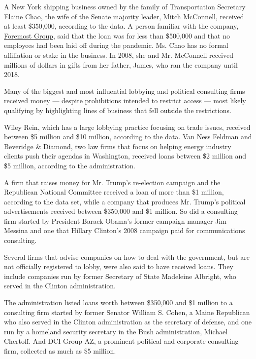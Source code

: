 A New York shipping business owned by the family of Transportation
Secretary Elaine Chao, the wife of the Senate majority leader, Mitch
McConnell, received at least \$350,000, according to the data. A person
familiar with the company,
\href{https://www.nytimes.com/2019/09/16/us/politics/elaine-chao-house-investigation.html}{Foremost
Group}, said that the loan was for less than \$500,000 and that no
employees had been laid off during the pandemic. Ms. Chao has no formal
affiliation or stake in the business. In 2008, she and Mr. McConnell
received millions of dollars in gifts from her father, James, who ran
the company until 2018.

Many of the biggest and most influential lobbying and political
consulting firms received money --- despite prohibitions intended to
restrict access --- most likely qualifying by highlighting lines of
business that fell outside the restrictions.

Wiley Rein, which has a large lobbying practice focusing on trade
issues, received between \$5 million and \$10 million, according to the
data. Van Ness Feldman and Beveridge \& Diamond, two law firms that
focus on helping energy industry clients push their agendas in
Washington, received loans between \$2 million and \$5 million,
according to the administration.

A firm that raises money for Mr. Trump's re-election campaign and the
Republican National Committee received a loan of more than \$1 million,
according to the data set, while a company that produces Mr. Trump's
political advertisements received between \$350,000 and \$1 million. So
did a consulting firm started by President Barack Obama's former
campaign manager Jim Messina and one that Hillary Clinton's 2008
campaign paid for communications consulting.

Several firms that advise companies on how to deal with the government,
but are not officially registered to lobby, were also said to have
received loans. They include companies run by former Secretary of State
Madeleine Albright, who served in the Clinton administration.

The administration listed loans worth between \$350,000 and \$1 million
to a consulting firm started by former Senator William S. Cohen, a Maine
Republican who also served in the Clinton administration as the
secretary of defense, and one run by a homeland security secretary in
the Bush administration, Michael Chertoff. And DCI Group AZ, a prominent
political and corporate consulting firm, collected as much as \$5
million.

